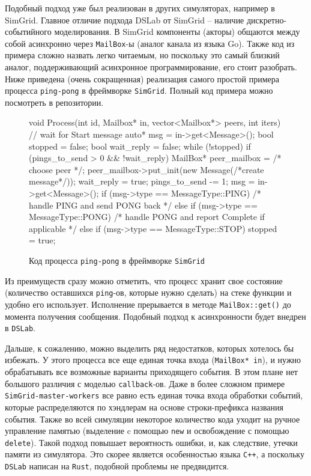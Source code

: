 Подобный подход уже был реализован в других симуляторах, например в SimGrid\cite{simgrid-article}. Главное отличие подхода DSLab от SimGrid -- наличие дискретно-событийного моделирования. В SimGrid компоненты (акторы) общаются между собой асинхронно через \texttt{MailBox}-ы (аналог канала из языка Go). Также код из примера сложно назвать легко читаемым, но поскольку это самый близкий аналог, поддерживающий асинхронное программирование, его стоит разобрать. Ниже приведена (очень сокращенная) реализация самого простой примера процесса \texttt{ping-pong} в фреймворке \texttt{SimGrid}. Полный код примера можно посмотреть в репозитории\cite{simgrid-example}.
\begin{figure}[H]
    \centering
    \small
\begin{cppcode}
void Process(int id, Mailbox* in, vector<Mailbox*> peers, int iters) {
    // wait for Start message
    auto* msg = in->get<Message>();
    bool stopped = false;
    bool wait_reply = false;
    while (!stopped) {
        if (pings_to_send > 0 && !wait_reply) {
            MailBox* peer_mailbox = /* choose peer */;
            peer_mailbox->put_init(new Message(/*create message*/));
            wait_reply = true;
            pings_to_send -= 1;
        }
        msg = in->get<Message>();
        if (msg->type == MessageType::PING) {
            /* handle PING and send PONG back */
        } else if (msg->type == MessageType::PONG) {
            /* handle PONG and report Complete if applicable */
        } else if (msg->type == MessageType::STOP) {
            stopped = true;
        }
    }
}
\end{cppcode}
\caption{Код процесса \texttt{ping-pong} в фреймворке \texttt{SimGrid}}
\label{simgridcode}
\end{figure}

Из преимуществ сразу можно отметить, что процесс хранит свое состояние (количество оставшихся \texttt{ping}-ов, которые нужно сделать) на стеке функции и удобно его использует. Исполнение прерывается в методе \texttt{MailBox::get()} до момента получения сообщения. Подобный подход к асинхронности будет внедрен в \texttt{DSLab}.

Дальше, к сожалению, можно выделить ряд недостатков, которых хотелось бы избежать. У этого процесса все еще единая точка входа (\texttt{MailBox* in}), и нужно обрабатывать все возможные варианты приходящего события. В этом плане нет большого различия с моделью \texttt{callback}-ов. Даже в более сложном примере \texttt{SimGrid-master-workers}\cite{simgrid-master-workers} все равно есть единая точка входа обработки событий, которые распределяются по хэндлерам на основе строки-префикса названия события.   
Также во всей симуляции некоторое количество кода уходит на ручное управление памятью (выделение c помощью \texttt{new} и освобождение с помощью \texttt{delete}). Такой подход повышает вероятность ошибки, и, как следствие, утечки памяти из симулятора. Это скорее является особенностью языка \texttt{C++}, а поскольку \texttt{DSLab} написан на \texttt{Rust}, подобной проблемы не предвидится.  


